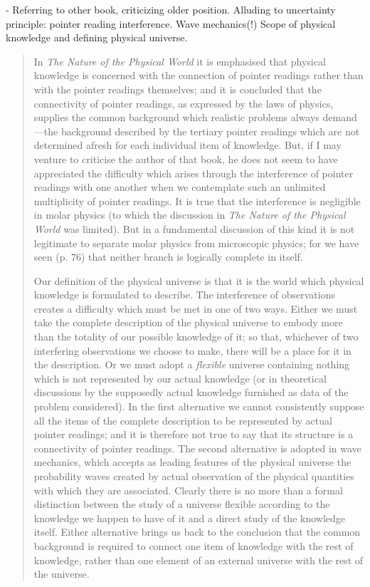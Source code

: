 \documentclass{article}
\begin{document}
- Referring to other book, criticizing older position.  Alluding to uncertainty principle: pointer reading interference.  Wave mechanics(!)  Scope of physical knowledge and defining physical universe.

\begin{quote}
    In \emph{The Nature of the Physical World} it is emphasised that physical knowledge is concerned with the connection of pointer readings rather than with the pointer readings themselves; and it is concluded that the connectivity of pointer readings, as expressed by the laws of physics, supplies the common background which realistic problems always demand---the background described by the tertiary pointer readings which are not determined afresh for each individual item of knowledge.  But, if I may venture to criticise the author of that book, he does not seem to have appreciated the difficulty which arises through the interference of pointer readings with one another when we contemplate such an unlimited multiplicity of pointer readings.  It is true that the interference is negligible in molar physics (to which the discussion in \emph{The Nature of the Physical World} was limited).  But in a fundamental discussion of this kind it is not legitimate to separate molar physics from microscopic physics; for we have seen (p. 76) that neither branch is logically complete in itself.  
    
    Our definition of the physical universe is that it is the world which physical knowledge is formulated to describe.  The interference of observations creates a difficulty which must be met in one of two ways.  Either we must take the complete description of the physical universe to embody more than the totality of our possible knowledge of it; so that, whichever of two interfering observations we choose to make, there will be a place for it in the description.  Or we must adopt a \emph{flexible} universe containing nothing which is not represented by our actual knowledge (or in theoretical discussions by the supposedly actual knowledge furnished as data of the problem considered).  In the first alternative we cannot consistently suppose all the items of the complete description to be represented by actual pointer readings; and it is therefore not true to say that its structure is a connectivity of pointer readings.  The second alternative is adopted in wave mechanics, which accepts as leading features of the physical universe the probability waves created by actual observation of the physical quantities with which they are associated.  Clearly there is no more than a formal distinction between the study of a universe flexible according to the knowledge we happen to have of it and a direct study of the knowledge itself.  Either alternative brings us back to the conclusion that the common background is required to connect one item of knowledge with the rest of knowledge, rather than one element of an external universe with the rest of the universe.
    \citep[p. 100-102]{Eddington1939}
\end{quote}
\end{document}

